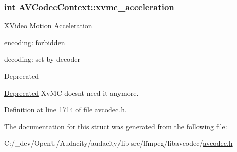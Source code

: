 \subsubsection[{\texorpdfstring{xvmc\+\_\+acceleration}{xvmc_acceleration}}]{ {\bf int} A\+V\+Codec\+Context\+::xvmc\+\_\+acceleration}\hypertarget{struct_a_v_codec_context_a358503f8848e8a496fc3de96ba62643a}{}\label{struct_a_v_codec_context_a358503f8848e8a496fc3de96ba62643a}
X\+Video Motion Acceleration
\begin{DoxyItemize}
\item encoding\+: forbidden
\item decoding\+: set by decoder \begin{DoxyRefDesc}{Deprecated}
\item[\hyperlink{deprecated__deprecated000015}{Deprecated}]Xv\+MC doesn\textquotesingle{}t need it anymore. \end{DoxyRefDesc}

\end{DoxyItemize}

Definition at line 1714 of file avcodec.\+h.



The documentation for this struct was generated from the following file\+:\begin{DoxyCompactItemize}
\item 
C\+:/\+\_\+dev/\+Open\+U/\+Audacity/audacity/lib-\/src/ffmpeg/libavcodec/\hyperlink{avcodec_8h}{avcodec.\+h}\end{DoxyCompactItemize}
